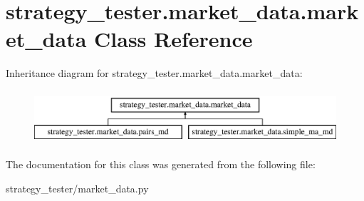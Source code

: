 \hypertarget{classstrategy__tester_1_1market__data_1_1market__data}{\section{strategy\-\_\-tester.\-market\-\_\-data.\-market\-\_\-data \-Class \-Reference}
\label{classstrategy__tester_1_1market__data_1_1market__data}
}
\-Inheritance diagram for strategy\-\_\-tester.\-market\-\_\-data.\-market\-\_\-data\-:\begin{figure}[H]
\begin{center}
\leavevmode
\includegraphics[height=2.000000cm]{classstrategy__tester_1_1market__data_1_1market__data}
\end{center}
\end{figure}


\-The documentation for this class was generated from the following file\-:\begin{DoxyCompactItemize}
\item 
strategy\-\_\-tester/market\-\_\-data.\-py\end{DoxyCompactItemize}
